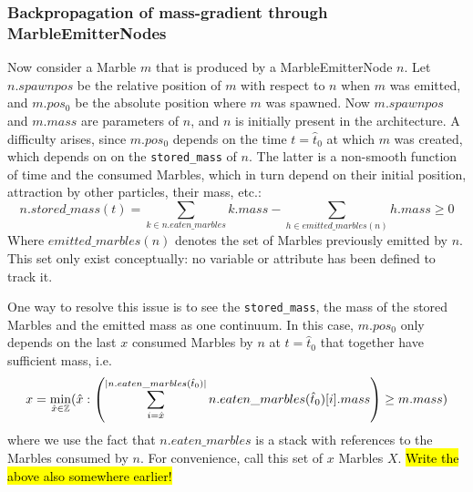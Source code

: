 \subsubsection{Backpropagation of mass-gradient through MarbleEmitterNodes}
Now consider a Marble $m$ that is produced by a MarbleEmitterNode $n$. Let $n.spawnpos$ be the relative position of $m$ with respect to $n$ when $m$ was emitted, and $m.pos_0$ be the absolute position where $m$ was spawned. Now $m.spawnpos$ and $m.mass$ are parameters of $n$, and $n$ is initially present in the architecture. 
A difficulty arises, since $m.pos_0$ depends on the time $t = \hat{t}_0$ at which $m$ was created, which depends on on the \texttt{stored\_mass} of $n$. The latter is a non-smooth function of time and the consumed Marbles, which in turn depend on their initial position, attraction by other particles, their mass, etc.:
\begin{equation}
    n.stored\_mass(t) = \sum_{k \in n.eaten\_marbles} k.mass - \sum_{h \in emitted\_marbles(n)} h.mass \geq 0
\end{equation}
Where $emitted\_marbles(n)$ denotes the set of Marbles previously emitted by $n$. This set only exist conceptually: no variable or attribute has been defined to track it.


One way to resolve this issue is to see the \texttt{stored\_mass}, the mass of the stored Marbles and the emitted mass as one continuum. 
In this case, $m.pos_0$ only depends on the last $x$ consumed Marbles by $n$ at $t = \hat{t}_0$ that together have sufficient mass, i.e.
\begin{equation}
    x = \min_{\hat{x} \in \mathbb{Z}} (\hat{x} : \left(\sum_{i = \hat{x}}^{\lvert n.eaten\_marbles(\hat{t}_0) \rvert} n.eaten\_marbles(\hat{t}_0)[i].mass\right) \geq m.mass )
\end{equation}
where we use the fact that $n.eaten\_marbles$ is a stack with references to the Marbles consumed by $n$. For convenience, call this set of $x$ Marbles $X$.
\hl{Write the above also somewhere earlier!}

